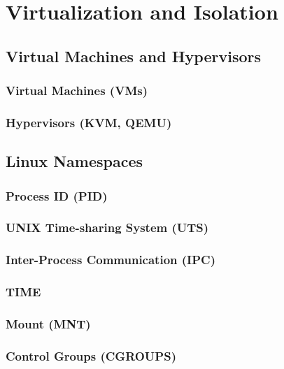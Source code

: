 \chapter{Virtualization and Isolation}

\section{Virtual Machines and Hypervisors}

    \subsection{Virtual Machines (VMs)}
    \subsection{Hypervisors (KVM, QEMU)}

\section{Linux Namespaces}

    \subsection{Process ID (PID)}
    \subsection{UNIX Time-sharing System (UTS)}
    \subsection{Inter-Process Communication (IPC)}
    \subsection{TIME}
    \subsection{Mount (MNT)}
    \subsection{Control Groups (CGROUPS)}


